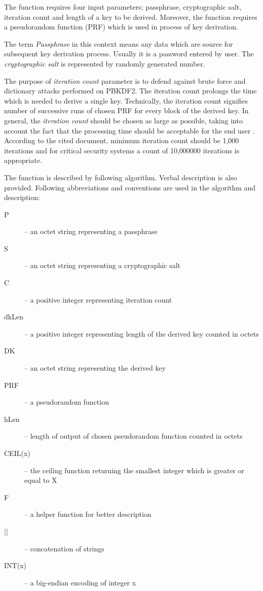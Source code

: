 \documentclass[nolof,digital]{fithesis3}
\begin{document}
The function requires four input parameters; passphrase, cryptographic salt, iteration count and length of a key to be derived. Moreover, the function requires a pseudorandom function (PRF) which is used in process of key derivation.

The term \emph{Passphrase} in this context means any data which are source for subsequent key derivation process. Usually it is a password entered by user. The \emph{cryptographic salt} is represented by randomly generated number.

The purpose of \emph{iteration count} parameter is to defend against brute force and dictionary attacks performed on PBKDF2. The iteration count prolongs the time which is needed to derive a single key. Technically, the iteration count signifies number of successive runs of chosen PRF for every block of the derived key. In general, the \emph{iteration count} should be chosen as large as possible, taking into account the fact that the processing time should be acceptable for the end user \parencite{nistpbkdf2}. According to the cited document, minimum iteration count should be 1,000 iterations and for critical security systems a count of 10,000000 iterations is appropriate. 

The function is described by following algorithm. Verbal description is also provided. Following abbreviations and conventions are used in the algorithm and description:

\begin{description}
\item[P] -- an octet string representing a passphrase

\item[S] -- an octet string representing a cryptographic salt

\item[C] -- a positive integer representing iteration count

\item[dkLen] -- a positive integer representing length of the derived key counted in octets

\item[DK] -- an octet string representing the derived key

\item[PRF] -- a pseudorandom function

\item[hLen] -- length of output of chosen pseudorandom function counted in octets

\item[CEIL(x)] -- the ceiling function returning the smallest integer which is greater or equal to X

\item[F] -- a helper function for better description

\item[||] -- concatenation of strings

\item[INT(x)] -- a big-endian encoding of integer x
\end{description}
\end{document}
